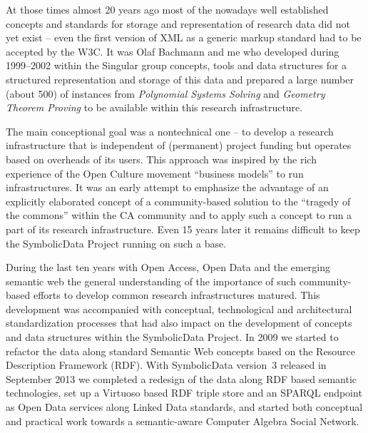 \documentclass{llncs}
\newcommand{\SD}{{\sc Symbo\-lic\-Data}}
\begin{document}
At those times almost 20 years ago most of the nowadays well established
concepts and standards for storage and representation of research data did not
yet exist -- even the first version of XML as a generic markup standard had to
be accepted by the W3C. It was Olaf Bachmann and me who developed during
1999--2002 within the Singular group concepts, tools and data structures for a
structured representation and storage of this data and prepared a large number
(about 500) of instances from \emph{Polynomial Systems Solving} and
\emph{Geometry Theorem Proving} to be available within this research
infrastructure.

The main conceptional goal was a nontechnical one -- to develop a research
infrastructure that is independent of (permanent) project funding but operates
based on overheads of its users. This approach was inspired by the rich
experience of the Open Culture movement ``business models'' to run
infrastructures. It was an early attempt to emphasize the advantage of an
explicitly elaborated concept of a community-based solution to the ``tragedy
of the commons'' \cite{hardin} within the CA community and to apply such a
concept to run a part of its research infrastructure.  Even 15 years later it
remains difficult to keep the {\SD} Project running on such a base.
\medskip

During the last ten years with Open Access, Open Data and the emerging
semantic web the general understanding of the importance of such
community-based efforts to develop common research infrastructures matured.
This development was accompanied with conceptual, technological and
architectural standardization processes that had also impact on the
development of concepts and data structures within the {\SD} Project.  In 2009
we started to refactor the data along standard Semantic Web concepts based on
the Resource Description Framework (RDF).  With {\SD} version~3 released in
September 2013 we completed a redesign of the data along RDF based semantic
technologies, set up a Virtuoso based RDF triple store and an SPARQL endpoint
as Open Data services along Linked Data standards, and started both conceptual
and practical work towards a semantic-aware Computer Algebra Social Network.
\end{document}
